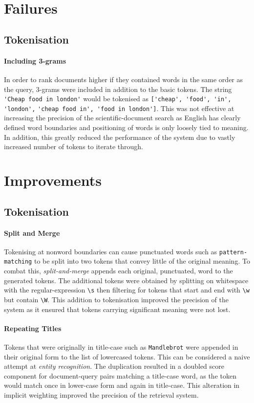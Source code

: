 \documentclass[10pt, a4paper, twocolumn]{article}   	%
\begin{document}
\section{Failures}
\subsection{Tokenisation}

\paragraph{Including 3-grams}
In order to rank documents higher if they contained words in the same order as the query, 3-grams were included in addition to the basic tokens. The string \verb|'Cheap food in london'| would be tokenised as \verb|['cheap', 'food', 'in', 'london',|
 \verb|'cheap food in', 'food in london']|. This was not effective at increasing the precision of the scientific-document search as English has clearly defined word boundaries and positioning of words is only loosely tied to meaning. In addition, this greatly reduced the performance of the system due to vastly increased number of tokens to iterate through.
\section{Improvements}
\subsection{Tokenisation}

 \paragraph{Split and Merge}
 Tokenising at nonword boundaries can cause punctuated words such as \verb|pattern-matching| to be split into two tokens that convey little of the original meaning. To combat this, \emph{split-and-merge} appends each original, punctuated, word to the generated tokens. The additional tokens were obtained by splitting on whitespace with the regular-expression \verb|\s| then filtering for tokens that start and end with \verb|\w| but contain \verb|\W|. This addition to tokenisation improved the precision of the system as it ensured that tokens carrying significant meaning were not lost.

\paragraph{Repeating Titles}
Tokens that were originally in title-case such as \verb|Mandlebrot| were appended in their original form to the list of lowercased tokens. This can be considered a naive attempt at \emph{entity recognition}. The duplication resulted in a doubled score component for document-query pairs matching a title-case word, as the token would match once in lower-case form and again in title-case. This alteration in implicit weighting improved the precision of the retrieval system.
\end{document}
